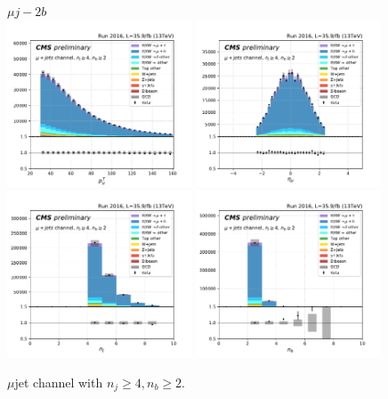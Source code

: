 \begin{figure}[ht]
    \centering
    $\mu j - 2b$ \\
    \includegraphics[width=0.49\textwidth]{chapters/Appendix/sectionPlots/figures/kinematics_pickles/mu4j/2b/mu4j_2b_lepton1_pt.pdf}
    \includegraphics[width=0.49\textwidth]{chapters/Appendix/sectionPlots/figures/kinematics_pickles/mu4j/2b/mu4j_2b_lepton1_eta.pdf}
    \includegraphics[width=0.49\textwidth]{chapters/Appendix/sectionPlots/figures/kinematics_pickles/mu4j/2b/mu4j_2b_nJets.pdf}
    \includegraphics[width=0.49\textwidth]{chapters/Appendix/sectionPlots/figures/kinematics_pickles/mu4j/2b/mu4j_2b_nBJets.pdf}
    
    \caption{$\mu$jet channel with $n_j\geq4, n_b\geq2$.}
\end{figure}
